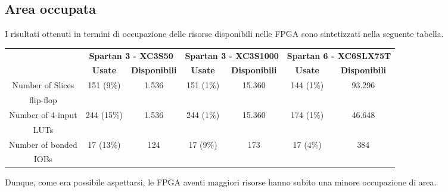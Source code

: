 \subsection{Area occupata}
I risultati ottenuti in termini di occupazione delle risorse disponibili nelle FPGA sono sintetizzati nella seguente tabella.
\begin{table}[H]
	\centering
	\fontsize{10}{18}\selectfont
	\begin{tabular}{|p{20mm}|p{13mm}|p{13mm}|p{13mm}|p{13mm}|p{13mm}|p{13mm}|}
		\hline
		\multicolumn{1}{|c|}{\multirow{2}{*}{}} &
		\multicolumn{2}{c|}{\textbf{Spartan 3 - XC3S50}} & 
		\multicolumn{2}{c|}{\textbf{Spartan 3 - XC3S1000}} & 
		\multicolumn{2}{c|}{\textbf{Spartan 6 - XC6SLX75T}} \\
		
		\cline{2-7} &
		\multicolumn{1}{c|}{\textbf{Usate}} & 
		\multicolumn{1}{c|}{\textbf{Disponibili}} &
		\multicolumn{1}{c|}{\textbf{Usate}} & 
		\multicolumn{1}{c|}{\textbf{Disponibili}} &
		\multicolumn{1}{c|}{\textbf{Usate}} & 
		\multicolumn{1}{c|}{\textbf{Disponibili}} \\
		
		\hline
		\multicolumn{1}{|c|}{Number of Slices} &
		\multicolumn{1}{|c|}{\multirow{2}{*}{151 (9\%)}} &
		\multicolumn{1}{|c|}{\multirow{2}{*}{1.536}} &
		\multicolumn{1}{|c|}{\multirow{2}{*}{151 (1\%)}} &
		\multicolumn{1}{|c|}{\multirow{2}{*}{15.360}} &
		\multicolumn{1}{|c|}{\multirow{2}{*}{144 (1\%)}} &
		\multicolumn{1}{|c|}{\multirow{2}{*}{93.296}} \\
		\multicolumn{1}{|c|}{flip-flop} &&&&&&\\
		
		\hline
		\multicolumn{1}{|c|}{Number of 4-input} &
		\multicolumn{1}{|c|}{\multirow{2}{*}{244 (15\%)}} &
		\multicolumn{1}{|c|}{\multirow{2}{*}{1.536}} &
		\multicolumn{1}{|c|}{\multirow{2}{*}{244 (1\%)}} &
		\multicolumn{1}{|c|}{\multirow{2}{*}{15.360}} &
		\multicolumn{1}{|c|}{\multirow{2}{*}{174 (1\%)}} &
		\multicolumn{1}{|c|}{\multirow{2}{*}{46.648}} \\
		\multicolumn{1}{|c|}{LUTs} &&&&&&\\
		
		\hline
		\multicolumn{1}{|c|}{Number of bonded} &
		\multicolumn{1}{|c|}{\multirow{2}{*}{17 (13\%)}} &
		\multicolumn{1}{|c|}{\multirow{2}{*}{124}} &
		\multicolumn{1}{|c|}{\multirow{2}{*}{17 (9\%)}} &
		\multicolumn{1}{|c|}{\multirow{2}{*}{173}} &
		\multicolumn{1}{|c|}{\multirow{2}{*}{17 (4\%)}} &
		\multicolumn{1}{|c|}{\multirow{2}{*}{384}} \\
		\multicolumn{1}{|c|}{IOBs} &&&&&&\\ \hline
		
	\end{tabular}
\end{table}
\noindent
Dunque, come era possibile aspettarsi, le FPGA aventi maggiori risorse hanno subito una minore occupazione di area.

